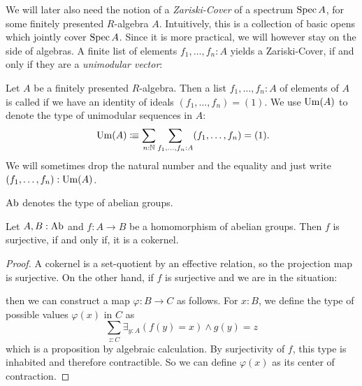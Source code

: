 We will later also need the notion of a \emph{Zariski-Cover} of a spectrum $\operatorname{Spec} A$,
for some finitely presented $R$-algebra $A$.
Intuitively, this is a collection of basic opens which jointly cover $\operatorname{Spec} A$.
Since it is more practical, we will however stay on the side of algebras.
A finite list of elements $f_1,\dots,f_n:A$ yields a Zariski-Cover,
if and only if they are a \emph{unimodular vector}:

\begin{definition}
  \label{unimodular}
  Let $A$ be a finitely presented $R$-algebra.
  Then a list $f_1,\dots,f_n:A$ of elements of $A$ is called 
  if we have an identity of ideals $(f_1,\dots,f_n)=(1)$.
  We use $\mathrm{Um}(A)$ to denote the type of unimodular sequences in $A$:
  \[
    \Um(A)\colonequiv \sum_{n:\N}\sum_{f_1,\dots,f_n:A} (f_1,\dots,f_n)=(1)
    \rlap{.}
  \]
  We will sometimes drop the natural number and the equality and just write $(f_1,\dots,f_n):\mathrm{Um}(A)$.
\end{definition}

\begin{definition}
  $\AbGroup$\index{$\AbGroup$} denotes the type of abelian groups.
\end{definition}

\begin{lemma}%
  \label{surjective-abgroup-hom-is-cokernel}
  Let $A,B:\operatorname{Ab}$ and $f:A\to B$ be a homomorphism of abelian groups.
  Then $f$ is surjective, if and only if, it is a cokernel.
\end{lemma}

\begin{proof}
  A cokernel is a set-quotient by an effective relation,
  so the projection map is surjective.
  On the other hand, if $f$ is surjective and we are in the situation:
  \begin{center}
  \end{center}
  then we can construct a map $\varphi:B\to C$ as follows.
  For $x:B$, we define the type of possible values $\varphi(x)$ in $C$ as
  \[
    \sum_{z:C}\exists_{y:A}(f(y)=x) \wedge g(y)=z
  \]
  which is a proposition by algebraic calculation.
  By surjectivity of $f$, this type is inhabited and therefore contractible.
  So we can define $\varphi(x)$ as its center of contraction.
\end{proof}

